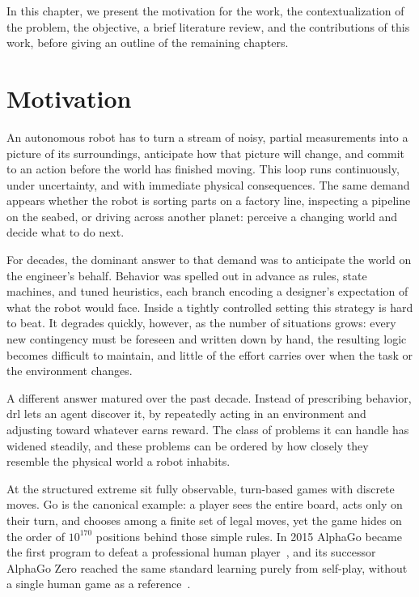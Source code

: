 
In this chapter, we present the motivation for the work, the contextualization
of the problem, the objective, a brief literature review,
and the contributions of this work, before giving an outline of the remaining
chapters.

\section{Motivation}

An autonomous robot has to turn a stream of noisy, partial measurements into
a picture of its surroundings, anticipate how that picture will change,
and commit to an action before the world has finished moving.  This loop runs
continuously, under uncertainty, and with immediate physical consequences.
The same demand appears whether the robot is sorting parts on a
factory line, inspecting a pipeline on the seabed, or driving across another
planet: perceive a changing world and decide what to do next.


For decades, the dominant answer to that demand was to anticipate the world on
the engineer's behalf.  Behavior was spelled out in advance as rules, state
machines, and tuned heuristics, each branch encoding a designer's expectation
of what the robot would face.  Inside a tightly controlled setting this strategy
is hard to beat.  It degrades quickly, however, as the number of situations
grows: every new contingency must be foreseen and written down by hand, the
resulting logic becomes difficult to maintain, and little of the effort carries
over when the task or the environment changes.

A different answer matured over the past decade.  Instead of prescribing
behavior, \gls{drl} lets an agent discover it, by repeatedly acting in an
environment and adjusting toward whatever earns reward.  The class of
problems it can handle has widened steadily, and these problems can be ordered by
how closely they resemble the physical world a robot inhabits.

At the structured extreme sit fully observable, turn-based games with discrete
moves.  Go is the canonical example: a player sees the entire board, acts only
on their turn, and chooses among a finite set of legal moves, yet the game hides
on the order of $10^{170}$ positions behind those simple rules.  In 2015
AlphaGo became the first program to defeat a professional human
player~\cite{silver2016mastering}, and its successor AlphaGo Zero reached the
same standard learning purely from self-play, without a single human game as a
reference~\cite{silver2017mastering}.

